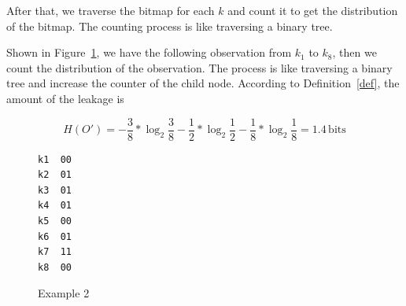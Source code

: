 After that, we traverse the bitmap for each $k$ and count it to get the distribution of the bitmap. The counting process is like traversing a binary tree.

\begin{myexample}
Shown in Figure~\ref{fig:design:example2}, we have the following observation from $k_1$ to $k_8$, then we count the distribution of  the observation. The process is like traversing a binary tree and increase the counter of the child node. According to Definition~\ref{def}, the amount of the leakage is

\begin{displaymath}
  H(O') = - \frac{3}{8}*\log_2{\frac{3}{8}}- \frac{1}{2}*\log_2{\frac{1}{2}}
  - \frac{1}{8}*\log_2{\frac{1}{8}} = 1.4 \,\mathrm{bits}
\end{displaymath}

\begin{figure}[h]
  \begin{minipage}{0.4\linewidth}
    \end{minipage}
  \hfill
  \begin{minipage}{0.18\linewidth}
    {
      \begin{lstlisting}[frame=none, numbers=none]
k1  00
k2  01
k3  01
k4  01
k5  00
k6  01
k7  11
k8  00
\end{lstlisting}
    }
  \end{minipage}
  \hfill
  \begin{minipage}{0.30\linewidth}
  \end{minipage}
  \caption{Example 2}\label{fig:design:example2}
\end{figure}
\end{myexample}


